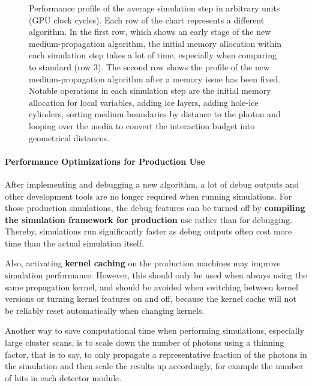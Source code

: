 
\begin{figure}[htbp]
  \caption{Performance profile of the average simulation step in arbitrary units (GPU clock cycles). Each row of the chart represents a different algorithm. In the first row, which shows an early stage of the new medium-propagation algorithm, the initial memory allocation within each simulation step takes a lot of time, especially when comparing to standard \clsim (row 3). The second row shows the profile of the new medium-propagation algorithm after a memory issue has been fixed. Notable operations in each simulation step are the initial memory allocation for local variables, adding ice layers, adding hole-ice cylinders, sorting medium boundaries by distance to the photon and looping over the media to convert the interaction budget into geometrical distances.}
  \label{fig:profiling-paz4Eig6}
\end{figure}


\paragraph{Performance Optimizations for Production Use}
After implementing and debugging a new algorithm, a lot of debug outputs and other development tools are no longer required when running simulations. For those production simulations, the debug features can be turned off by \textbf{compiling the \icecube simulation framework for production} use rather than for debugging. Thereby, simulations run significantly faster as debug outputs often cost more time than the actual simulation itself.


Also, activating \textbf{kernel caching} on the production machines may improve simulation performance. However, this should only be used when always using the same propagation kernel, and should be avoided when switching between kernel versions or turning kernel features on and off, because the kernel cache will not be reliably reset automatically when changing kernels.


Another way to save computational time when performing simulations, especially large cluster scans, is to scale down the number of photons using a thinning factor, that is to say, to only propagate a representative fraction of the photons in the simulation and then scale the results up accordingly, for example the number of hits in each detector module.

